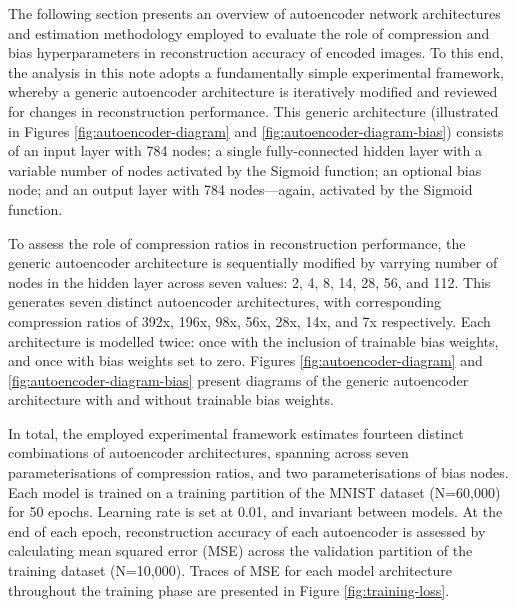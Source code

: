 
The following section presents an overview of autoencoder network architectures and estimation methodology employed to evaluate the role of compression and bias hyperparameters in reconstruction accuracy of encoded images. 
To this end, the analysis in this note adopts a fundamentally simple experimental framework, whereby a generic autoencoder architecture is iteratively modified and reviewed for changes in reconstruction performance.
This generic architecture (illustrated in Figures \ref{fig:autoencoder-diagram} and \ref{fig:autoencoder-diagram-bias}) consists of an input layer with 784 nodes; a single fully-connected hidden layer with a variable number of nodes activated by the Sigmoid function; an optional bias node; and an output layer with 784 nodes---again, activated by the Sigmoid function.

To assess the role of compression ratios in reconstruction performance, the generic autoencoder architecture is sequentially modified by varrying number of nodes in the hidden layer across seven values: 2, 4, 8, 14, 28, 56, and 112.
This generates seven distinct autoencoder architectures, with corresponding compression ratios of 392x, 196x, 98x, 56x, 28x, 14x, and 7x respectively.
Each architecture is modelled twice: once with the inclusion of trainable bias weights, and once with bias weights set to zero.
Figures \ref{fig:autoencoder-diagram} and \ref{fig:autoencoder-diagram-bias} present diagrams of the generic autoencoder architecture with and without trainable bias weights. 

In total, the employed experimental framework estimates fourteen distinct combinations of autoencoder architectures, spanning across seven parameterisations of compression ratios, and two parameterisations of bias nodes. 
Each model is trained on a training partition of the MNIST dataset (N=60,000) for 50 epochs.
Learning rate is set at 0.01, and invariant between models.
At the end of each epoch, reconstruction accuracy of each autoencoder is assessed by calculating mean squared error (MSE) across the validation partition of the training dataset (N=10,000).
Traces of MSE for each model architecture throughout the training phase are presented in Figure \ref{fig:training-loss}.



